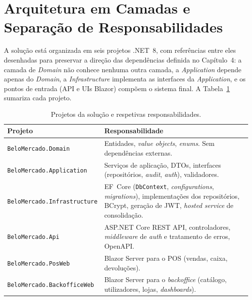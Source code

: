 \section{Arquitetura em Camadas e Separação de Responsabilidades}

    A solução está organizada em seis projetos .NET~8, com referências entre eles desenhadas para preservar a direção das dependências definida no Capítulo~4: a camada de \textit{Domain} não conhece nenhuma outra camada, a \textit{Application} depende apenas do \textit{Domain}, a \textit{Infrastructure} implementa as interfaces da \textit{Application}, e os pontos de entrada (API e UIs Blazor) compõem o sistema final. A Tabela~\ref{tab:projetos_solucao} sumariza cada projeto.

    \begin{table}[H]
    \centering
    \small
    \begin{tabular}{|p{4.5cm}|p{9.5cm}|}
    \hline
    \textbf{Projeto} & \textbf{Responsabilidade} \\
    \hline
    \texttt{BeloMercado.Domain} & Entidades, \textit{value objects}, \textit{enums}. Sem dependências externas. \\
    \hline
    \texttt{BeloMercado.Application} & Serviços de aplicação, DTOs, interfaces (repositórios, \textit{audit}, \textit{auth}), validadores. \\
    \hline
    \texttt{BeloMercado.Infrastructure} & EF~Core (\texttt{DbContext}, \textit{configurations}, \textit{migrations}), implementações dos repositórios, BCrypt, geração de JWT, \textit{hosted service} de consolidação. \\
    \hline
    \texttt{BeloMercado.Api} & ASP.NET Core REST API, controladores, \textit{middleware} de \textit{auth} e tratamento de erros, OpenAPI. \\
    \hline
    \texttt{BeloMercado.PosWeb} & Blazor Server para o POS (vendas, caixa, devoluções). \\
    \hline
    \texttt{BeloMercado.BackofficeWeb} & Blazor Server para o \textit{backoffice} (catálogo, utilizadores, lojas, \textit{dashboards}). \\
    \hline
    \end{tabular}
    \caption{Projetos da solução e respetivas responsabilidades.}
    \label{tab:projetos_solucao}
    \end{table}

